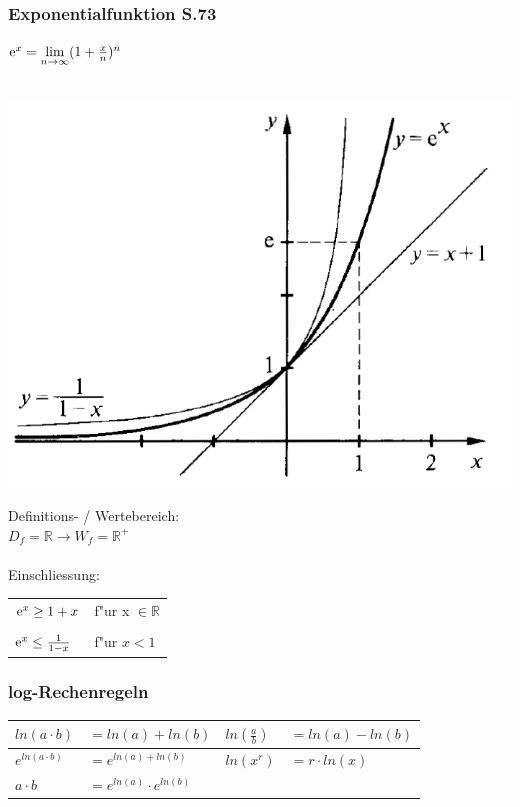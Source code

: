 		\columnbreak
				
		\subsubsection{Exponentialfunktion S.73}
			$\mathrm{e}^x = \lim\limits_{n \to \infty} (1+\frac{x}{n})^n $ \\
			\\
			\begin{minipage}{.45\linewidth}
				\includegraphics[width=0.95\linewidth]{Bilder/exp-funktion}
			\end{minipage}
			\hfill
			\begin{minipage}{.5\linewidth}
				Definitions- / Wertebereich: \\
				$D_f = \mathbb{R} \rightarrow W_f = \mathbb{R^+}$ \\
				\\
				Einschliessung: \\
					\begin{tabular}{ll}
					$\mathrm{e}^x \geq 1 + x$ & f"ur x $\in \mathbb{R}$ \\
					\\
					$\mathrm{e}^x \leq \frac{1}{1-x}$ & f"ur $x < 1$  \\
					\end{tabular}
			\end{minipage}

		\subsubsection{log-Rechenregeln}
			\begin{tabular}{|ll|ll|}
				\hline
				$ln(a \cdot b)$ & $= ln(a) + ln(b)$         & $ln(\frac{a}{b})$ & $= ln(a) - ln(b)$ \\
				\hline
				$e^{ln(a \cdot b)}$ & $= e^{ln(a) + ln(b)}$ & $ln(x^r)$         & $= r \cdot ln(x)$ \\
				\hline
				$a \cdot b$ & $= e^{ln(a)} \cdot e^{ln(b)}$ &                   &                   \\
				\hline
			\end{tabular}

